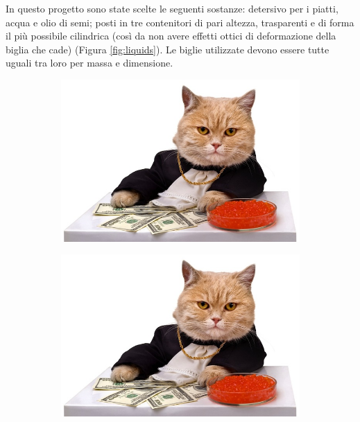 \documentclass{report} \usepackage[T1]{fontenc} \usepackage[italian]{babel}
\begin{document}
In questo progetto sono state scelte le seguenti sostanze: detersivo per i piatti,
acqua e olio di semi; posti in tre contenitori di pari altezza, trasparenti e di forma
il più possibile cilindrica (così da non avere effetti ottici di deformazione della
biglia che cade) (Figura \ref{fig:liquids}).
Le biglie utilizzate devono essere tutte uguali tra loro per massa e dimensione.
\begin{figure}[H]
\centering
  \begin{subfigure}[b]{0.5\textwidth}
  \includegraphics[width=\textwidth]{cat_caviar}
  \end{subfigure}
  \begin{subfigure}[b]{0.5\textwidth}
  \includegraphics[width=\textwidth]{cat_caviar}
  \end{subfigure}
  \begin{subfigure}[b]{0.5\textwidth}

\end{subfigure}
\end{figure}
\end{document}
